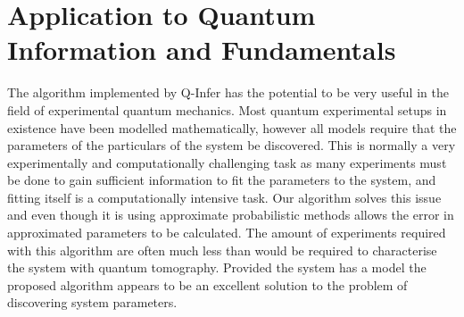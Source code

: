 \section{Application to Quantum Information and Fundamentals}
The algorithm implemented by Q-Infer has the potential to be very useful in the field of experimental quantum mechanics. Most quantum experimental setups in existence have been modelled mathematically, however all models require that the parameters of the particulars of the system be discovered. This is normally a very experimentally and computationally challenging task as many experiments must be done to gain sufficient information to fit the parameters to the system, and fitting itself is a computationally intensive task. Our algorithm solves this issue and even though it is using approximate probabilistic methods allows the error in approximated parameters to be calculated. The amount of experiments required with this algorithm are often much less than would be required to characterise the system with quantum tomography. Provided the system has a model the proposed algorithm appears to be an excellent solution to the problem of discovering system parameters. 


